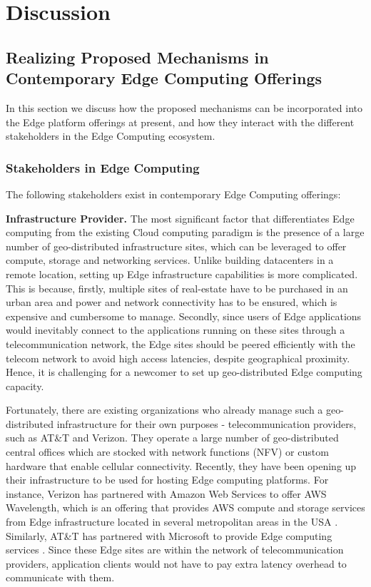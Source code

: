 \chapter{Discussion}
\label{sec:discussion}

\section{Realizing Proposed Mechanisms in Contemporary Edge Computing Offerings}
In this section we discuss how the proposed mechanisms can be incorporated into the Edge platform offerings at present, and how they interact with the different stakeholders in the Edge Computing ecosystem.
\subsection{Stakeholders in Edge Computing}
The following stakeholders exist in contemporary Edge Computing offerings:
\par \noindent \textbf{Infrastructure Provider.} The most significant factor that differentiates Edge computing from the existing Cloud computing paradigm is the presence of a large number of geo-distributed infrastructure sites, which can be leveraged to offer compute, storage and networking services. Unlike building datacenters in a remote location, setting up Edge infrastructure capabilities is more complicated. This is because, firstly, multiple sites of real-estate have to be purchased in an urban area and power and network connectivity has to be ensured, which is expensive and cumbersome to manage. Secondly, since users of Edge applications would inevitably connect to the applications running on these sites through a telecommunication network, the Edge sites should be peered efficiently with the telecom network to avoid high access latencies, despite geographical proximity. Hence, it is challenging for a newcomer to set up geo-distributed Edge computing capacity.
\par Fortunately, there are existing organizations who already manage such a geo-distributed infrastructure for their own purposes - telecommunication providers, such as AT\&T and Verizon. They operate a large number of geo-distributed central offices which are stocked with network functions (NFV) or custom hardware that enable cellular connectivity. Recently, they have been opening up their infrastructure to be used for hosting Edge computing platforms. For instance, Verizon has partnered with Amazon Web Services to offer AWS Wavelength, which is an offering that provides AWS compute and storage services from Edge infrastructure located in several metropolitan areas in the USA \cite{aws_wavelength}. Similarly, AT\&T has partnered with Microsoft to provide Edge computing services \cite{att_microsoft}. Since these Edge sites are within the network of telecommunication providers, application clients would not have to pay extra latency overhead to communicate with them. 
